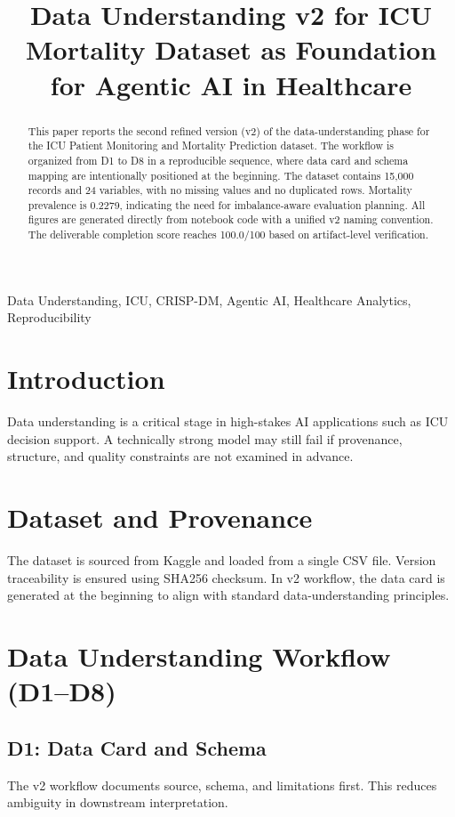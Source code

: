 \documentclass[conference]{IEEEtran}
\title{Data Understanding v2 for ICU Mortality Dataset as Foundation for Agentic AI in Healthcare}
\author{\IEEEauthorblockN{Hamzah Arman Husni}
\IEEEauthorblockA{Magister Kecerdasan Artifisial\\
Universitas Gadjah Mada\\
Yogyakarta, Indonesia}}
\begin{document}
\maketitle

\begin{abstract}
This paper reports the second refined version (v2) of the data-understanding phase for the ICU Patient Monitoring and Mortality Prediction dataset. The workflow is organized from D1 to D8 in a reproducible sequence, where data card and schema mapping are intentionally positioned at the beginning. The dataset contains 15,000 records and 24 variables, with no missing values and no duplicated rows. Mortality prevalence is 0.2279, indicating the need for imbalance-aware evaluation planning. All figures are generated directly from notebook code with a unified v2 naming convention. The deliverable completion score reaches 100.0/100 based on artifact-level verification.
\end{abstract}

\begin{IEEEkeywords}
Data Understanding, ICU, CRISP-DM, Agentic AI, Healthcare Analytics, Reproducibility
\end{IEEEkeywords}

\section{Introduction}
Data understanding is a critical stage in high-stakes AI applications such as ICU decision support. A technically strong model may still fail if provenance, structure, and quality constraints are not examined in advance.

\section{Dataset and Provenance}
The dataset is sourced from Kaggle and loaded from a single CSV file. Version traceability is ensured using SHA256 checksum. In v2 workflow, the data card is generated at the beginning to align with standard data-understanding principles.

\section{Data Understanding Workflow (D1--D8)}
\subsection{D1: Data Card and Schema}
The v2 workflow documents source, schema, and limitations first. This reduces ambiguity in downstream interpretation.
\end{document}
